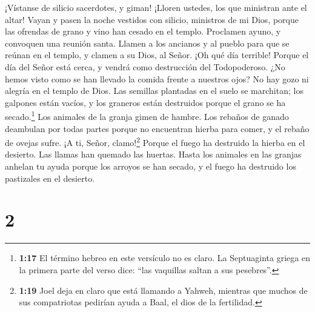  ¡Vístanse de silicio sacerdotes, y giman! ¡Lloren ustedes,
los que ministran ante el altar! Vayan y pasen la noche vestidos con
silicio, ministros de mi Dios, porque las ofrendas de grano y vino han
cesado en el templo.  Proclamen ayuno, y convoquen una
reunión santa. Llamen a los ancianos y al pueblo para que se reúnan en
el templo, y clamen a su Dios, al Señor.  ¡Oh qué día
terrible! Porque el día del Señor está cerca, y vendrá como destrucción
del Todopoderoso.  ¿No hemos visto como se han llevado la
comida frente a nuestros ojos? No hay gozo ni alegría en el templo de
Dios.  Las semillas plantadas en el suelo se marchitan; los
galpones están vacíos, y los graneros están destruidos porque el grano
se ha secado.\footnote{\textbf{1:17} El término hebreo en este versículo
  no es claro. La Septuaginta griega en la primera parte del verso dice:
  ``las vaquillas saltan a sus pesebres''.}  Los animales
de la granja gimen de hambre. Los rebaños de ganado deambulan por todas
partes porque no encuentran hierba para comer, y el rebaño de ovejas
sufre.  ¡A ti, Señor, clamo!\footnote{\textbf{1:19} Joel
  deja en claro que está llamando a Yahweh, mientras que muchos de sus
  compatriotas pedirían ayuda a Baal, el dios de la fertilidad.} Porque
el fuego ha destruido la hierba en el desierto. Las llamas han quemado
las huertas.  Hasta los animales en las granjas anhelan tu
ayuda porque los arroyos se han secado, y el fuego ha destruido los
pastizales en el desierto.

\hypertarget{section-1}{%
\section{2}\label{section-1}}

